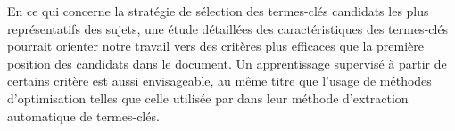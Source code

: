   En ce qui concerne la stratégie de sélection des termes-clés candidats les
  plus représentatifs des sujets, une étude détaillées des caractéristiques des
  termes-clés pourrait orienter notre travail vers des critères plus efficaces
  que la première position des candidats dans le document. Un apprentissage
  supervisé à partir de certains critère est aussi envisageable, au même titre
  que l'usage de méthodes d'optimisation telles que celle utilisée par
   dans leur méthode d'extraction
  automatique de termes-clés.

